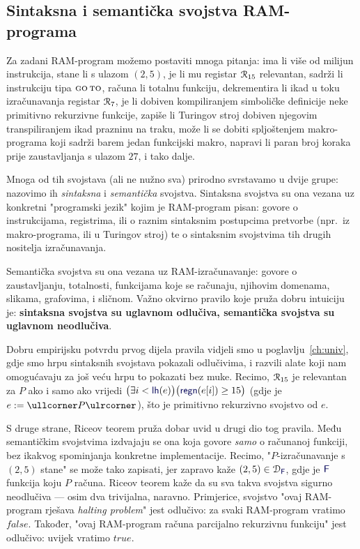 \subsection{Sintaksna i semantička svojstva RAM-programa}

Za zadani RAM-program možemo postaviti mnoga pitanja: ima li više od milijun instrukcija, stane li s ulazom $(2,5)$, je li mu registar $\mathcal R_{15}$ relevantan, sadrži li instrukciju tipa $\textsc{go\,to}$, računa li totalnu funkciju, dekrementira li ikad u toku izračunavanja registar $\mathcal R_{7}$, je li dobiven kompiliranjem simboličke definicije neke primitivno rekurzivne funkcije, zapiše li Turingov stroj dobiven njegovim transpiliranjem ikad prazninu na traku, može li se dobiti spljoštenjem makro-programa koji sadrži barem jedan funkcijski makro, napravi li paran broj koraka prije zaustavljanja s ulazom $27$, i tako dalje.

Mnoga od tih svojstava (ali ne nužno sva) prirodno svrstavamo u dvije grupe: nazovimo ih \emph{sintaksna} i \emph{semantička} svojstva. Sintaksna svojstva su ona vezana uz konkretni "programski jezik" kojim je RAM-program pisan: govore o instrukcijama, registrima, ili o raznim sintaksnim postupcima pretvorbe (npr.\ iz makro-programa, ili u Turingov stroj) te o sintaksnim svojstvima tih drugih nositelja izračunavanja.

Semantička svojstva su ona vezana uz RAM-izračunavanje: govore o zaustavljanju, totalnosti, funkcijama koje se računaju, njihovim domenama, slikama, grafovima, i sličnom. Važno okvirno pravilo koje pruža dobru intuiciju je: \textbf{sintaksna svojstva su uglavnom odlučiva, semantička svojstva su uglavnom neodlučiva}.

Dobru empirijsku potvrdu prvog dijela pravila vidjeli smo u poglavlju~\ref{ch:univ}, gdje smo hrpu sintaksnih svojstava pokazali odlučivima, i razvili alate koji nam omogućavaju za još veću hrpu to pokazati bez muke. Recimo, $\mathcal R_{15}$ je relevantan za $P$ ako i samo ako vrijedi
$\bigl(\exists i<\f{lh}(e)\bigr)\bigl(\f{regn}(e[i])\ge15\bigr)$ (gdje je $e:=\kprog P$), što je primitivno rekurzivno svojstvo od $e$.

S druge strane, Riceov teorem pruža dobar uvid u drugi dio tog pravila. Među semantičkim svojstvima izdvajaju se ona koja govore \emph{samo} o računanoj funkciji, bez ikakvog spominjanja konkretne implementacije. Recimo, "$P$-izračunavanje s $(2,5)$ stane" se može tako zapisati, jer zapravo kaže $(2,5)\in\dom{\f F}$, gdje je $\f F$ funkcija koju $P$ računa. Riceov teorem kaže da su sva takva svojstva sigurno neodlučiva --- osim dva trivijalna, naravno. Primjerice, svojstvo "ovaj RAM-program rješava \emph{halting problem}" jest odlučivo: za svaki RAM-program vratimo $\mathit{false}$. Također, "ovaj RAM-program računa parcijalno rekurzivnu funkciju" jest odlučivo: uvijek vratimo $\mathit{true}$.

